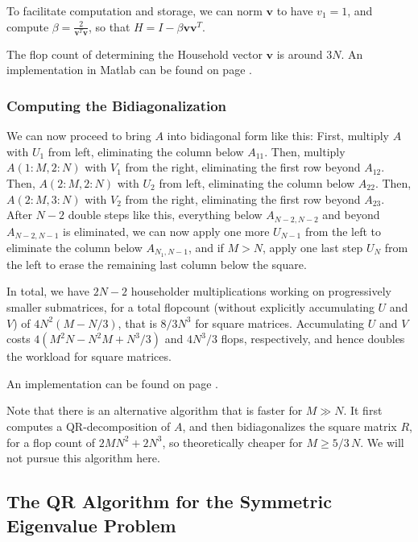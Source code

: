 \documentclass[11pt]{article}
\newcommand{\ve}[1]{\ensuremath{\mathbf{#1}}}
\begin{document}
To facilitate computation and storage, we can norm \ve v to have $v_1=1$, and compute $\beta = \frac 2{\ve v^T \ve v}$, so that $H = I - \beta \ve v \ve v^T$.

The flop count of determining the Household vector \ve v is around $3N$. An implementation in Matlab can be found on page \pageref{rc:house}.

\subsubsection{Computing the Bidiagonalization}
We can now proceed to bring $A$ into bidiagonal form like this: First, multiply $A$ with $U_1$ from left, eliminating the column below $A_{11}$. Then, multiply $A(1:M,2:N)$ with $V_1$ from the right, eliminating the first row beyond $A_{12}$. Then, $A(2:M,2:N)$ with $U_2$ from left, eliminating the column below $A_{22}$. Then, $A(2:M,3:N)$ with $V_2$ from the right, eliminating the first row beyond $A_{23}$. After $N-2$ double steps like this, everything below $A_{N-2,N-2}$ and beyond $A_{N-2,N-1}$ is eliminated, we can now apply one more $U_{N-1}$ from the left to eliminate the column below $A_{N_1,N-1}$, and if $M>N$, apply one last step $U_N$ from the left to erase the remaining last column below the square.

In total, we have $2N-2$ householder multiplications working on progressively smaller submatrices, for a total flopcount (without explicitly accumulating $U$ and $V$) of $4N^2(M-N/3)$, that is $8/3N^3$ for square matrices. Accumulating $U$ and $V$ costs $4(M^2N-N^2M+N^3/3)$ and $4N^3/3$ flops, respectively, and hence doubles the workload for square matrices.

An implementation can be found on page \pageref{rc:bidighh}.

Note that there is an alternative algorithm that is faster for $M\gg N$. It first computes a QR-decomposition of $A$, and then bidiagonalizes the square matrix $R$, for a flop count of $2MN^2+2N^3$, so theoretically cheaper for $M\ge 5/3\,N$. We will not pursue this algorithm here.

\subsection{The QR Algorithm for the Symmetric Eigenvalue Problem}
\end{document}
